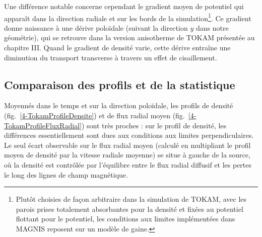 \begin{refsection}
Une différence notable concerne cependant le gradient moyen de potentiel qui
apparaît dans la direction radiale et sur les bords de la 
simulation\footnote{Plutôt choisies de façon arbitraire dans la simulation de
TOKAM, avec les parois prises totalement absorbantes pour la densité et fixées
au potentiel flottant pour le potentiel, les conditions aux limites
implémentées dans MAGNIS reposent sur un modèle de gaine.}. Ce gradient donne
naissance à une dérive poloïdale (suivant la direction $y$ dans notre
géométrie), qui se retrouve dans la version anisotherme de TOKAM présentée au chapitre III.
Quand le gradient de densité varie, cette dérive entraîne une diminution du
transport transverse à travers un effet de cisaillement. 

\subsection{Comparaison des profils et de la statistique}

Moyennés dans le temps et sur la direction poloïdale, les profils de densité
(fig.~\ref{4-TokamProfileDensite}) et de flux radial moyen
(fig.~\ref{4-TokamProfileFluxRadial}) sont très proches : sur le profil de
densité, les différences essentiellement sont dues aux conditions aux limites
perpendiculaires. Le seul écart observable sur le flux radial
moyen (calculé en multipliant le profil moyen de densité par la vitesse
radiale moyenne) se situe à gauche de la source, où la densité est contrôlée par
l'équilibre entre le flux radial diffusif et les pertes le long des lignes de
champ magnétique.


\end{refsection}
